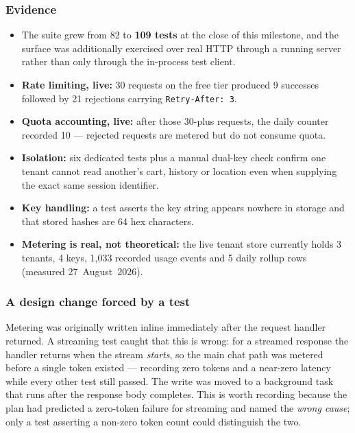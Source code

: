 \documentclass[11pt,a4paper]{article}
\newcommand{\code}[1]{\texttt{\small #1}}
\begin{document}
\subsubsection*{Evidence}

\begin{itemize}[itemsep=3pt,topsep=4pt]
\item The suite grew from 82 to \textbf{109 tests} at the close of this
      milestone, and the surface was additionally exercised over real HTTP
      through a running server rather than only through the in-process test
      client.
\item \textbf{Rate limiting, live:} 30 requests on the free tier produced
      9 successes followed by 21 rejections carrying \code{Retry-After: 3}.
\item \textbf{Quota accounting, live:} after those 30-plus requests, the daily
      counter recorded 10 --- rejected requests are metered but do not consume
      quota.
\item \textbf{Isolation:} six dedicated tests plus a manual dual-key check
      confirm one tenant cannot read another's cart, history or location even
      when supplying the exact same session identifier.
\item \textbf{Key handling:} a test asserts the key string appears nowhere in
      storage and that stored hashes are 64 hex characters.
\item \textbf{Metering is real, not theoretical:} the live tenant store
      currently holds 3 tenants, 4 keys, 1{,}033 recorded usage events and 5
      daily rollup rows (measured 27~August~2026).
\end{itemize}

\subsubsection*{A design change forced by a test}

Metering was originally written inline immediately after the request handler
returned. A streaming test caught that this is wrong: for a streamed response
the handler returns when the stream \emph{starts}, so the main chat path was
metered before a single token existed --- recording zero tokens and a
near-zero latency while every other test still passed. The write was moved to
a background task that runs after the response body completes. This is worth
recording because the plan had predicted a zero-token failure for streaming
and named the \emph{wrong cause}; only a test asserting a non-zero token count
could distinguish the two.
\end{document}
